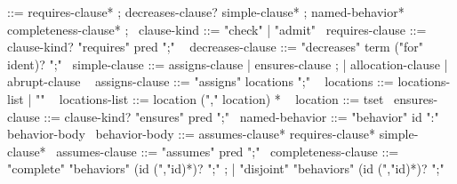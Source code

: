 \begin{syntax}
   ::= requires-clause* ;
                            { decreases-clause? } simple-clause* ;
                            named-behavior* completeness-clause* ;
  \
  clause-kind ::= "check" | "admit"
  \
  requires-clause ::= clause-kind? "requires" pred ";"
  \
  { decreases-clause } ::= { "decreases" term ("for" ident)? ";" }
  \
  simple-clause ::= { assigns-clause } | ensures-clause ;
                  | { allocation-clause} | { abrupt-clause }
  \
  { assigns-clause } ::= { "assigns" locations ";" }
  \
  { locations } ::= { locations-list | "\nothing" }
  \
  { locations-list } ::= { location ("," location) * }
  \
  { location } ::= { tset }
  \
  ensures-clause ::= clause-kind? "ensures" pred ";"
  \
  named-behavior ::= "behavior" id ":" behavior-body
  \
  behavior-body ::= assumes-clause* requires-clause* simple-clause*
  \
  assumes-clause ::= "assumes" pred ";"
  \
  completeness-clause ::= "complete" "behaviors" (id (","id)*)? ";" ;
                        | "disjoint" "behaviors" (id (","id)*)? ";"
\end{syntax}
